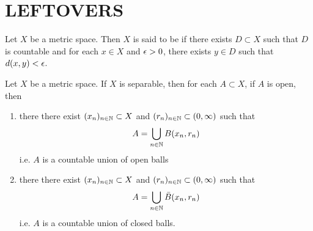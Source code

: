 \documentclass{book}
\begin{document}


































































\newpage
\section{LEFTOVERS}
\begin{defn}
	Let $X$ be a metric space. Then $X$ is said to be  if there exists $D \subset X$ such that $D$ is countable and for each $x \in X$ and $\epsilon >0$, there exists $y \in D$ such that $d(x, y) < \epsilon$.
\end{defn}

\begin{ex}
	Let $X$ be a metric space. If $X$ is separable, then for each $A \subset X$, if $A$ is open, then 
	\begin{enumerate}
		\item there there exist $(x_n)_{n \in \mathbb{N}} \subset X$ and $(r_n)_{n \in \mathbb{N}} \subset (0, \infty)$ such that $$A = \bigcup\limits_{n \in \mathbb{N}} B(x_n, r_n)$$
		i.e. $A$ is a countable union of open balls
		\item there there exist $(x_n)_{n \in \mathbb{N}} \subset X$ and $(r_n)_{n \in \mathbb{N}} \subset (0, \infty)$ such that $$A = \bigcup\limits_{n \in \mathbb{N}} \bar{B}(x_n, r_n)$$
		i.e. $A$ is a countable union of closed balls.
	\end{enumerate}
\end{ex}
\end{document}
